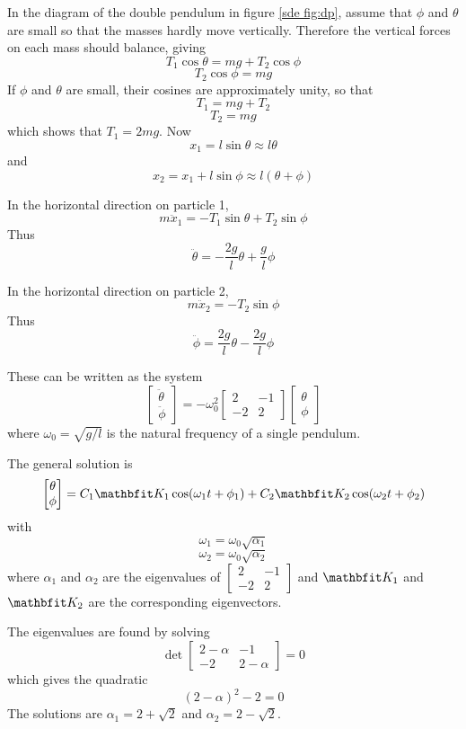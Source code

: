 \begin{example}
In the diagram of the double pendulum in figure \ref{sde fig:dp}, assume
that $\phi$ and $\theta$ are small so that the masses hardly move
vertically.  Therefore the vertical forces on each mass should balance,
giving
$$T_1\cos\theta=mg+T_2\cos\phi$$
$$T_2\cos\phi=mg$$
If $\phi$ and $\theta$ are small, their cosines are approximately unity, so
that
$$T_1=mg+T_2$$
$$T_2=mg$$
which shows that $T_1=2mg$.  Now 
$$x_1=l\sin\theta\approx l\theta$$
and
$$x_2=x_1+l\sin\phi\approx l(\theta+\phi)$$

In the horizontal direction on particle 1,
$$m\ddot{x}_1=-T_1\sin\theta+T_2\sin\phi$$
Thus
$$\ddot{\theta}=-\frac{2g}{l}\theta+\frac{g}{l}\phi$$

In the horizontal direction on particle 2,
$$m\ddot{x}_2=-T_2\sin\phi$$
Thus
$$\ddot{\phi}=\frac{2g}{l}\theta-\frac{2g}{l}\phi$$

These can be written as the system
$$\begin{bmatrix}\ddot{\theta}\\\ddot{\phi}\end{bmatrix}
=-\omega_0^2\begin{bmatrix}2&-1\\-2&2\end{bmatrix}
\begin{bmatrix}\theta\\\phi\end{bmatrix}$$
where $\omega_0=\sqrt{g/l}$ is the natural frequency of a single pendulum.

The general solution is 
$$\begin{bmatrix}\theta\\\phi\end{bmatrix}
=C_1\vect{K}_1\cos(\omega_1t+\phi_1)
+C_2\vect{K}_2\cos(\omega_2t+\phi_2)$$
with
$$\omega_1=\omega_0\sqrt{\alpha_1}$$
$$\omega_2=\omega_0\sqrt{\alpha_2}$$
where $\alpha_1$ and $\alpha_2$ are the eigenvalues of 
$\begin{bmatrix}2&-1\\-2&2\end{bmatrix}$ and $\vect{K}_1$ and
$\vect{K}_2$ are the corresponding eigenvectors.

The eigenvalues are found by solving
$$\det\begin{bmatrix}2-\alpha&-1\\-2&2-\alpha\end{bmatrix}=0$$
which gives the quadratic
$$(2-\alpha)^2-2=0$$
The solutions are $\alpha_1=2+\sqrt{2}$ and $\alpha_2=2-\sqrt{2}$.


\end{example}
